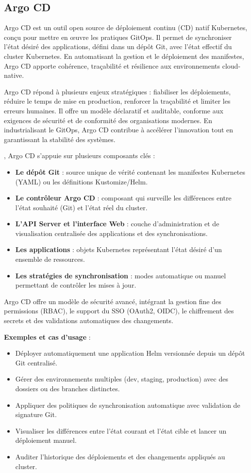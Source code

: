 \subsection{Argo CD}

Argo CD est un outil open source de déploiement continu (CD) natif Kubernetes, conçu pour mettre en œuvre les pratiques GitOps. Il permet de synchroniser l’état désiré des applications, défini dans un dépôt Git, avec l’état effectif du cluster Kubernetes. En automatisant la gestion et le déploiement des manifestes, Argo CD apporte cohérence, traçabilité et résilience aux environnements cloud-native.

 Argo CD répond à plusieurs enjeux stratégiques  : fiabiliser les déploiements, réduire le temps de mise en production, renforcer la traçabilité et limiter les erreurs humaines. Il offre un modèle déclaratif et auditable, conforme aux exigences de sécurité et de conformité des organisations modernes. En industrialisant le GitOps, Argo CD contribue à accélérer l’innovation tout en garantissant la stabilité des systèmes.

, Argo CD s’appuie sur plusieurs composants clés  :
\begin{itemize}
	\item \textbf{Le dépôt Git}  : source unique de vérité contenant les manifestes Kubernetes (YAML) ou les définitions Kustomize/Helm.
	\item \textbf{Le contrôleur Argo CD}  : composant qui surveille les différences entre l’état souhaité (Git) et l’état réel du cluster.
	\item \textbf{L’API Server et l’interface Web}  : couche d’administration et de visualisation centralisée des applications et des synchronisations.
	\item \textbf{Les applications}  : objets Kubernetes représentant l’état désiré d’un ensemble de ressources.
	\item \textbf{Les stratégies de synchronisation}  : modes automatique ou manuel permettant de contrôler les mises à jour.
\end{itemize}

Argo CD offre un modèle de sécurité avancé, intégrant la gestion fine des permissions (RBAC), le support du SSO (OAuth2, OIDC), le chiffrement des secrets et des validations automatiques des changements.

\textbf{Exemples et cas d’usage} :
\begin{itemize}
	\item Déployer automatiquement une application Helm versionnée depuis un dépôt Git centralisé.
	\item Gérer des environnements multiples (dev, staging, production) avec des dossiers ou des branches distinctes.
	\item Appliquer des politiques de synchronisation automatique avec validation de signature Git.
	\item Visualiser les différences entre l’état courant et l’état cible et lancer un déploiement manuel.
	\item Auditer l’historique des déploiements et des changements appliqués au cluster.
\end{itemize}

